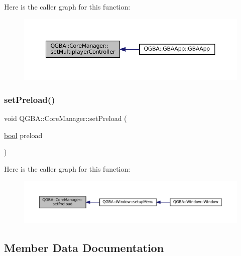 Here is the caller graph for this function\+:
\nopagebreak
\begin{figure}[H]
\begin{center}
\leavevmode
\includegraphics[width=350pt]{class_q_g_b_a_1_1_core_manager_a3f60ebb15fa19bacc1e441b7c9447cf7_icgraph}
\end{center}
\end{figure}
\mbox{\label{class_q_g_b_a_1_1_core_manager_a13e52a9e469da842073a50ddc9654476}} 
\subsubsection{\texorpdfstring{set\+Preload()}{setPreload()}}
{\footnotesize\ttfamily void Q\+G\+B\+A\+::\+Core\+Manager\+::set\+Preload (\begin{DoxyParamCaption}\item[{\mbox{\hyperlink{libretro_8h_a4a26dcae73fb7e1528214a068aca317e}{bool}}}]{preload }\end{DoxyParamCaption})\hspace{0.3cm}{\ttfamily [inline]}}

Here is the caller graph for this function\+:
\nopagebreak
\begin{figure}[H]
\begin{center}
\leavevmode
\includegraphics[width=350pt]{class_q_g_b_a_1_1_core_manager_a13e52a9e469da842073a50ddc9654476_icgraph}
\end{center}
\end{figure}


\subsection{Member Data Documentation}
\mbox{\label{class_q_g_b_a_1_1_core_manager_a03be1cec0f33e56086a2891cfc7944a3}} 
